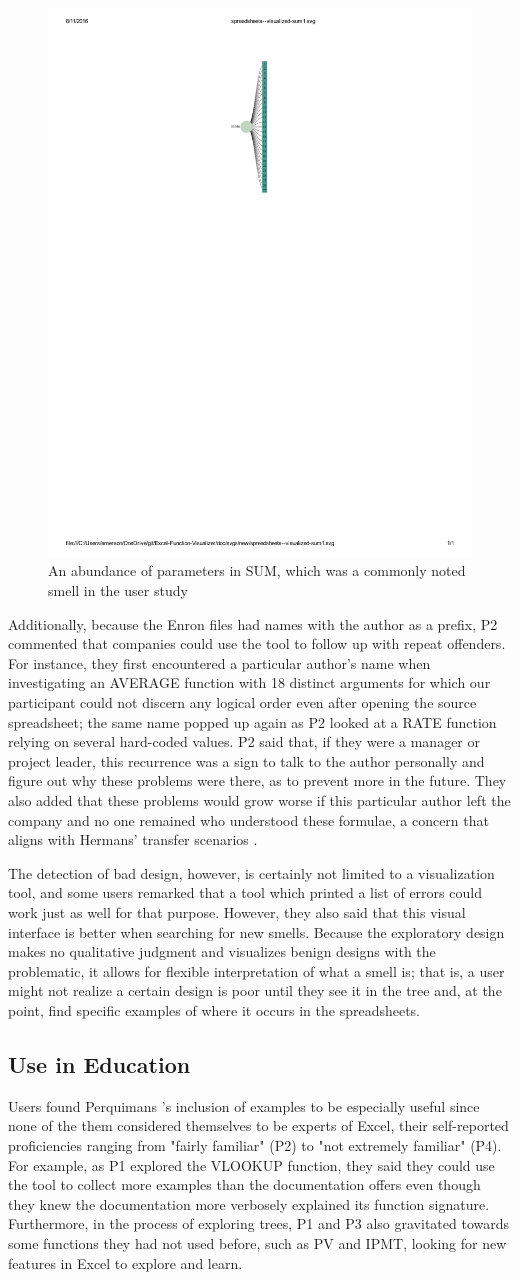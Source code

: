 \documentclass[conference]{IEEEtran}
\newcommand{\toolname}{Perquimans } \newcommand{\toolnameend}{Perquimans}
\begin{document}
	\begin{figure}
		\centering \includegraphics[width=.20\textwidth]{SUM}  \caption{An abundance of parameters in SUM, which was a commonly noted smell in the user study} \label{fig:sum} \end{figure}
	
	Additionally, because the Enron files had names with the author as a
	prefix, P2 commented that companies could use the tool to
	follow up with repeat offenders. For instance, they first encountered a
	particular author's name when investigating an AVERAGE function with 18
	distinct arguments for which our participant could not discern any logical
	order even after opening the source spreadsheet; the same name popped up again
	as P2 looked at a RATE function relying on several hard-coded values. P2 said
	that, if they were a manager or project leader, this recurrence was a sign to
	talk to the author personally and figure out why these problems were there, as
	to prevent more in the future. They also added that these problems would grow
	worse if this particular author left the company and no one remained who
	understood these formulae, a concern that aligns with Hermans' transfer
	scenarios \cite{hermans2011supporting}.
	
	The detection of bad design, however, is certainly not limited to a
	visualization tool, and some users remarked that a tool which printed a list of
	errors could work just as well for that purpose. However, they also said
	that this visual interface is better when searching for new smells. 
	Because the exploratory design makes no
	qualitative judgment and visualizes benign designs with the problematic, it
	allows for flexible interpretation of what a smell is; that is, a
	user might not realize a certain design is poor until they see it in the
	tree and, at the point, find specific examples of where it occurs in the
	spreadsheets.
	
	\subsection{Use in Education} Users found \toolname's inclusion of examples to
	be especially useful since none of the them considered themselves to be experts
	of Excel, their self-reported proficiencies ranging from "fairly familiar" (P2)
	to "not extremely familiar" (P4). For example, as P1 explored the VLOOKUP
	function, they said they could use the tool to collect more examples than the
	documentation offers even though they knew the documentation more verbosely
	explained its function signature. Furthermore, in the process of exploring
	trees, P1 and P3 also gravitated towards some functions they had not used
	before, such as PV and IPMT, looking for new features in Excel to explore and
	learn. \par
	
\end{document}
